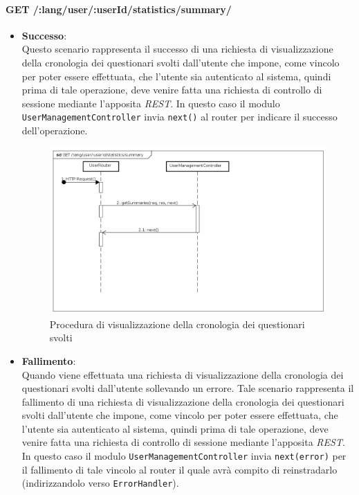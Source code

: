 \paragraph{GET /:lang/user/:userId/statistics/summary/}
\begin{itemize}
\item \textbf{Successo}:
\\
Questo scenario rappresenta il successo di una richiesta di visualizzazione della cronologia dei questionari svolti dall'utente che impone, come vincolo per poter essere effettuata, che l'utente sia autenticato al sistema, quindi prima di tale operazione, deve venire fatta una richiesta di controllo di sessione mediante l'apposita \textit{REST}.  
In questo caso il modulo \texttt{UserManagementController} invia \texttt{next()} al router per indicare il successo dell'operazione.
\label{Procedura di visualizzazione della cronologia dei questionari svolti}
\begin{figure}[ht]
	\centering
	\includegraphics[scale=0.40]{UML/DiagrammiDiSequenza/Back-end/GET_LangUserUserIdStatisticsSummarySuccess.png}
	\caption{Procedura di visualizzazione della cronologia dei questionari svolti}
\end{figure}
\FloatBarrier
\item \textbf{Fallimento}:
\\
Quando viene effettuata una richiesta di visualizzazione della cronologia dei questionari svolti dall'utente sollevando un errore. Tale scenario rappresenta il fallimento di una richiesta di visualizzazione della cronologia dei questionari svolti dall'utente che impone, come vincolo per poter essere effettuata, che l'utente sia autenticato al sistema, quindi prima di tale operazione, deve venire fatta una richiesta di controllo di sessione mediante l'apposita \textit{REST}. In questo caso il modulo \texttt{UserManagementController} invia \texttt{next(error)} per il fallimento di tale vincolo al router il quale avrà compito di reinstradarlo (indirizzandolo verso \texttt{ErrorHandler}).

\end{itemize}
